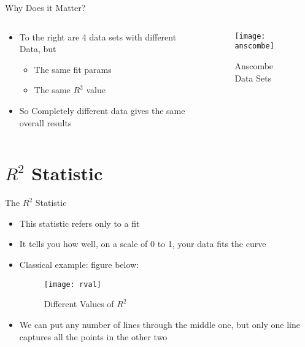 \documentclass{beamer}
\begin{document}
\begin{frame}{Why Does it Matter?}
  \begin{columns}
    \begin{column}{0.5\textwidth}
      \begin{itemize}
      \item To the right are 4 data sets with different Data, but
        \begin{itemize}
        \item The same fit params
        \item The same $R^2$ value
        \end{itemize}
      \item So Completely different data gives the same overall results
      \end{itemize}
    \end{column}
    \begin{column}{0.5\textwidth}
      \begin{figure}[H]
        \centering
        \texttt{[image: anscombe]}
        \caption{Anscombe Data Sets}
      \end{figure}
    \end{column}
  \end{columns}
\end{frame}

\section{$R^2$ Statistic}
\begin{frame}{The $R^2$ Statistic}
  \begin{itemize}
  \item This statistic refers only to a fit
  \item It tells you how well, on a scale of 0 to 1, your data fits the curve
  \item Classical example: figure below:
    \begin{figure}[H]
      \centering
      \texttt{[image: rval]}
      \caption{Different Values of $R^2$}
    \end{figure}
  \item We can put any number of lines through the middle one, but only one line captures all the points in the other two
  \end{itemize}
\end{frame}
\end{document}
